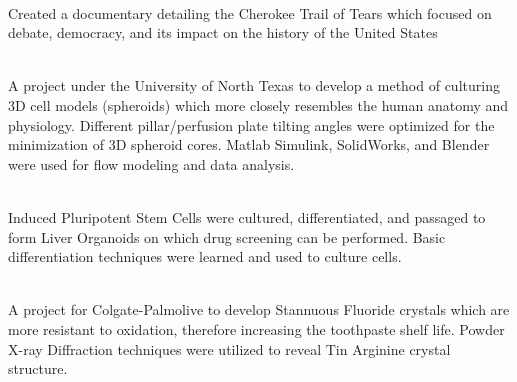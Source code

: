 \documentclass[a4paper]{MagicalCV}
\begin{document}
\begin{minipage}[t]{0.66\textwidth}
 \\
\vspace{\topsep} %
\begin{tightemize}
\item Created a documentary detailing the Cherokee Trail of Tears which focused on debate, democracy, and its impact on the history of the United States
\end{tightemize}
\sectionsep


 \\
 A project under the University of North Texas to develop a method of culturing 3D cell models (spheroids) which more closely resembles the human anatomy and physiology. Different pillar/perfusion plate tilting angles were optimized for the minimization of 3D spheroid cores. Matlab Simulink, SolidWorks, and Blender were used for flow modeling and data analysis.
\sectionsep

 \\
Induced Pluripotent Stem Cells were cultured, differentiated, and passaged to form Liver Organoids on which  drug screening can be performed. Basic differentiation techniques were learned and used to culture cells.
\sectionsep

 \\
 A project for Colgate-Palmolive to develop Stannuous Fluoride crystals which are more resistant to oxidation, therefore increasing the toothpaste shelf life. Powder X-ray Diffraction techniques were utilized to reveal Tin Arginine crystal structure.
\end{minipage} 

\newpage
\end{document}
